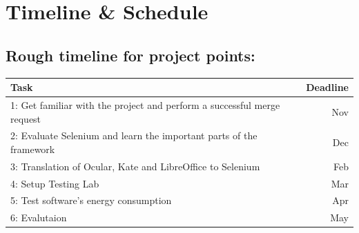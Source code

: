 \chapter{Timeline \& Schedule}
\section{Rough timeline for project points:}
\begin{center}
    \begin{tabular}{ | l | r | }
    \hline
    Task & Deadline \\
    \hline\hline
    1: Get familiar with the project and perform a successful merge request   & Nov \\
    \hline
    2: Evaluate Selenium and learn the important parts of the framework & Dec\\
    \hline
    3: Translation of Ocular, Kate and LibreOffice to Selenium & Feb\\
    \hline
    4: Setup Testing Lab & Mar\\
    \hline
    5: Test software's energy consumption & Apr\\
    \hline
    6: Evalutaion & May\\
    \hline
    \end{tabular}
\end{center}


